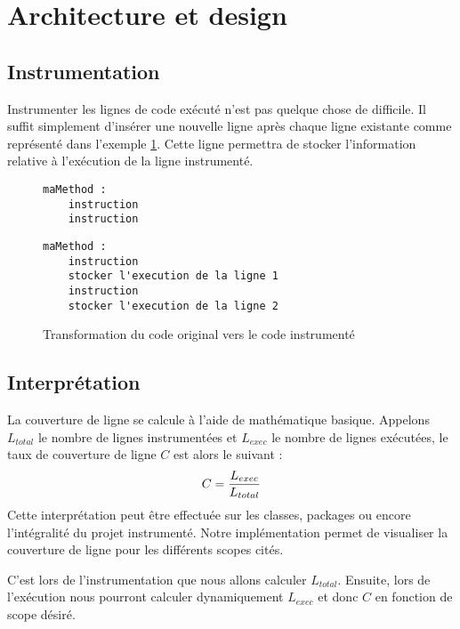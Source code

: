 \section{Architecture et design}

\subsection{Instrumentation}
\label{instrumentation}

Instrumenter les lignes de code exécuté n'est pas quelque chose de difficile. Il suffit simplement d'insérer une nouvelle ligne après chaque ligne existante comme représenté dans l'exemple   \ref{example_instrumentation}. Cette ligne permettra de stocker l'information relative à l'exécution de la ligne instrumenté.

\begin{figure}[h]
\begin{lstlisting}[linewidth=5.0cm]
maMethod :
	instruction
	instruction
\end{lstlisting}
\begin{lstlisting}[linewidth=11cm]
maMethod :
	instruction
	stocker l'execution de la ligne 1
	instruction
	stocker l'execution de la ligne 2
\end{lstlisting}

\caption{Transformation du code original vers le code instrumenté}
\label{example_instrumentation}
\end{figure}

\subsection{Interprétation}
\label{interpretation}

La couverture de ligne se calcule à l'aide de mathématique basique. Appelons $L_{total}$ le nombre de lignes instrumentées et $L_{exec}$ le nombre de lignes exécutées, le taux de couverture de ligne $C$ est alors le suivant :
\begin{equation}
C = { L_{exec} \over L_{total} }
\end{equation}
Cette interprétation peut être effectuée sur les classes, packages ou encore l'intégralité du projet instrumenté. Notre implémentation permet de visualiser la couverture de ligne pour les différents scopes cités.
\par C'est lors de l'instrumentation que nous allons calculer $L_{total}$. Ensuite, lors de l'exécution nous pourront calculer dynamiquement $L_{exec}$ et donc $C$ en fonction de scope désiré.

